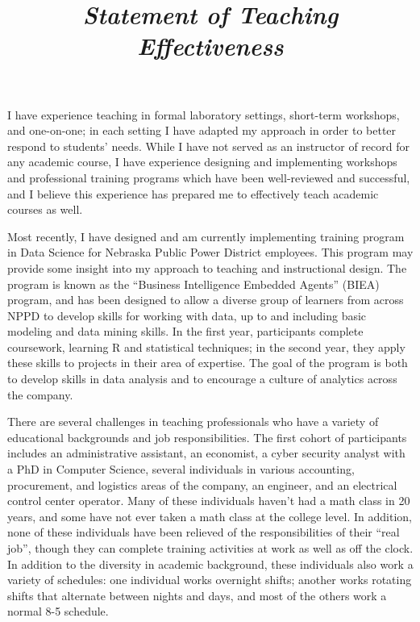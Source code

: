 \documentclass[12pt, letterpaper, sans]{moderncv}
\title{\emph{Statement of Teaching Effectiveness}}
\begin{document}
\makecvtitle
\setlength{\parindent}{15pt} %

I have experience teaching in formal laboratory settings, short-term workshops, and one-on-one; in each setting I have adapted my approach in order to better respond to students' needs. While I have not served as an instructor of record for any academic course, I have experience designing and implementing workshops and professional training programs which have been well-reviewed and successful, and I believe this experience has prepared me to effectively teach academic courses as well. 

\vspace{.5cm}\hspace{8pt} 
Most recently, I have designed and am currently implementing training program in Data Science for Nebraska Public Power District employees. This program may provide some insight into my approach to teaching and instructional design. The program is known as the ``Business Intelligence Embedded Agents'' (BIEA) program, and has been designed to allow a diverse group of learners from across NPPD to develop skills for working with data, up to and including basic modeling and data mining skills. In the first year, participants complete coursework, learning R and statistical techniques; in the second year, they apply these skills to projects in their area of expertise. The goal of the program is both to develop skills in data analysis and to encourage a culture of analytics across the company.  

There are several challenges in teaching professionals who have a variety of educational backgrounds and job responsibilities. The first cohort of participants includes an administrative assistant, an economist, a cyber security analyst with a PhD in Computer Science, several individuals in various accounting, procurement, and logistics areas of the company, an engineer, and an electrical control center operator. Many of these individuals haven't had a math class in 20 years, and some have not ever taken a math class at the college level. In addition, none of these individuals have been relieved of the responsibilities of their ``real job'', though they can complete training activities at work as well as off the clock. In addition to the diversity in academic background, these individuals also work a variety of schedules: one individual works overnight shifts; another works rotating shifts that alternate between nights and days, and most of the others work a normal 8-5 schedule. 
\end{document}
